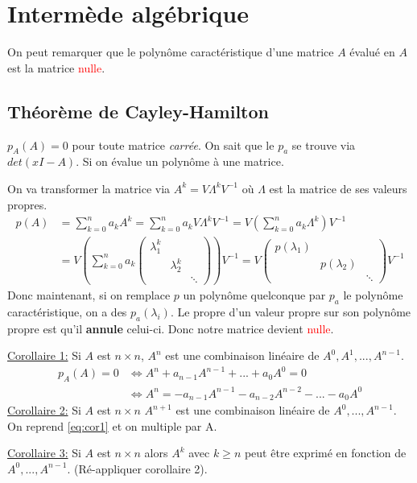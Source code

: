 \documentclass{report}
\begin{document}
\section{Intermède algébrique} 
On peut remarquer que le polynôme caractéristique d'une matrice $A$ évalué en $A$ est la matrice \textcolor{red}{nulle}.
\subsection{Théorème de Cayley-Hamilton}
$p_A (A) = 0$ pour toute matrice \textit{carrée}. On sait que le $p_a$ se trouve via $det(xI - A)$. Si on évalue un polynôme à une matrice. \par 
On va transformer la matrice via $A^{k} = V \Lambda^k V^{-1}$ où $\Lambda$ est la matrice de ses valeurs propres.
\begin{align*}
p(A) &= \sum_{k=0}^n a_k A^k = \sum_{k=0}^n a_k V \Lambda^k V^{-1}
= V \left( \sum_{k=0}^n a_k \Lambda^k \right) V^{-1}\\
&= V \left(  \sum_{k=0}^n a_k \begin{pmatrix}
\lambda_1^k & & \\
 & \lambda_2^k & \\
& & \ddots
\end{pmatrix} \right) V^{-1} = V \begin{pmatrix}
p(\lambda_1) & & \\
 & p(\lambda_2) & \\
 & & \ddots
\end{pmatrix} V^{-1}
\end{align*}
Donc maintenant, si on remplace $p$ un polynôme quelconque par $p_a$ le polynôme caractéristique, on a des $p_a(\lambda_i)$. Le propre d'un valeur propre sur son polynôme propre est qu'il \textbf{annule} celui-ci. Donc notre matrice devient \textcolor{red}{nulle}.\par \noindent
\underline{Corollaire 1:} Si $A$ est $n \times n$, $A^n$ est une combinaison linéaire de $A^0, A^1, ... , A^{n-1}$.
\begin{align}
p_A (A) = 0 & \Leftrightarrow A^n + a_{n-1}A^{n-1} + ... + a_0 A^0 = 0\\
& \Leftrightarrow A^n = -a_{n-1} A^{n-1} - a_{n-2} A^{n-2} - ... - a_0 A^0 \label{eq:cor1}
\end{align}
\underline{Corollaire 2:} Si $A$ est $n \times n$ $A^{n+1}$ est une combinaison linéaire de $A^0, ..., A^{n-1}$. On reprend \ref{eq:cor1} et on multiple par A. \par  \noindent
\underline{Corollaire 3:} Si $A$ est $n \times n$ alors $A^k$ avec $k \geqslant n$ peut être exprimé en fonction de $A^0, ..., A^{n-1}$. (Ré-appliquer corollaire 2).
\end{document}
